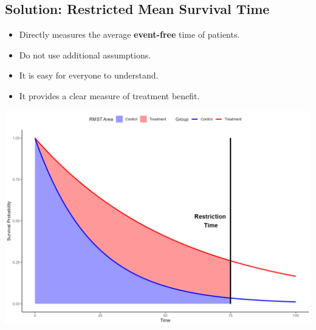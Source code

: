 \documentclass[a0,landscape]{a0poster}
\begin{document}
\begin{minipage}[t]{0.44\linewidth}
    \subsection*{\color{HeadingColor}\huge Solution: Restricted Mean Survival Time}
    \begin{itemize}
        \item[{\color{BulletColor}\Large\checkmark}] \Large Directly measures the average \textbf{event-free} time of patients.
        \item[{\color{BulletColor}\Large\checkmark}] \Large Do not use additional assumptions.
        \item[{\color{BulletColor}\Large\checkmark}] \Large It is easy for everyone to understand.
        \item[{\color{BulletColor}\Large\checkmark}] \Large It provides a clear measure of treatment benefit.
    \end{itemize}
    \hfill
  \vspace{0.2cm}    
    {\centering \includegraphics[width=\linewidth,height = 0.75\linewidth]{images/rmst_causal_plot.png}\par}
\end{minipage}
\hfill
\end{document}

